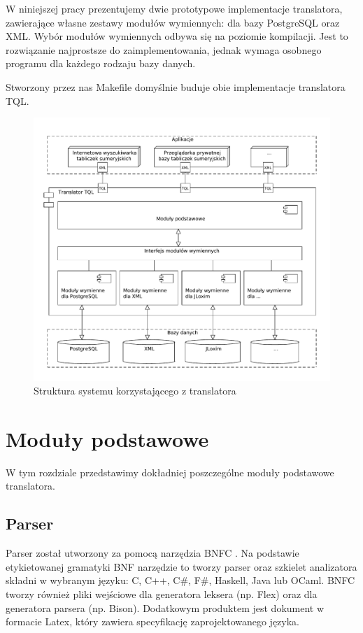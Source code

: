  W niniejszej pracy prezentujemy dwie prototypowe implementacje translatora, zawierające własne zestawy modułów wymiennych: 
dla bazy PostgreSQL oraz XML.
Wybór modułów wymiennych odbywa się na poziomie kompilacji. Jest to rozwiązanie najprostsze do zaimplementowania,
jednak wymaga osobnego programu dla każdego rodzaju bazy danych.

 Stworzony przez nas Makefile domyślnie buduje obie implementacje translatora TQL.

\begin{figure}[h]
 \centering
 \includegraphics[width=450px,bb=0 0 608 517]{../diagramy/struktura2.pdf}
 \caption{Struktura systemu korzystającego z translatora}
 \label{struktura_systemu}
\end{figure}

\chapter{Moduły podstawowe}

W tym rozdziale przedstawimy dokładniej poszczególne moduły podstawowe translatora.

\section{Parser}
Parser został utworzony za pomocą narzędzia BNFC \cite{bnfc}. Na podstawie etykietowanej gramatyki BNF 
narzędzie to tworzy parser oraz szkielet analizatora składni w wybranym języku: C, C++, C\#, F\#, Haskell, Java lub OCaml. 
BNFC tworzy również pliki wejściowe dla generatora leksera (np. Flex) oraz dla generatora parsera (np. Bison). 
Dodatkowym produktem jest dokument w formacie Latex, który zawiera specyfikację zaprojektowanego języka.



